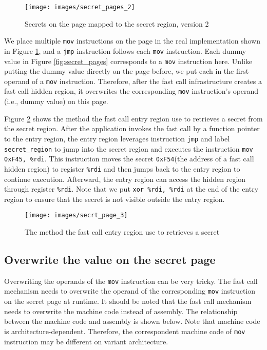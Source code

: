  \begin{figure}[tbp]
   \centering
   \texttt{[image: images/secret\_pages\_2]}
   \caption[Short description]{Secrets on the page mapped to the secret region, version 2}
    \label{fig:secret_pages_2}
 \end{figure}
  
 We place multiple \verb|mov| instructions on the page in the real implementation shown in Figure \ref{fig:secret_pages_2},
 and a \verb|jmp| instruction follows each \verb|mov| instruction. Each dummy value in 
 Figure \ref{fig:secret_pages} corresponds to a \verb|mov| instruction here. Unlike putting the 
 dummy value directly on the page before, we put each in the first operand of
  a \verb|mov| instruction. Therefore, after the fast call infrastructure creates a fast 
  call hidden region, it overwrites the corresponding \verb|mov| instruction's 
  operand (i.e., dummy value) on this page.  

  Figure \ref{fig:secrt_page_3}  shows the method the fast call entry region use to retrieves a 
  secret from the secret region. After the application invokes the 
  fast call by a function pointer to the entry region, the entry region 
  leverages instruction \verb|jmp| and label \verb|secret_region| to jump into the 
  secret region and executes the instruction \verb|mov 0xF45, %rdi|. This 
  instruction moves the secret \verb|0xF54|(the address of a fast call hidden region) 
  to register \verb|%rdi| and then jumps back to the entry region to continue execution. 
  Afterward, the entry region can access the hidden region through register \verb|%rdi|.
  Note that we put  \verb|xor %rdi, %rdi| at the end of the entry region to ensure that the secret is not visible outside the entry region. 

  \begin{figure}[H]
    \centering
    \texttt{[image: images/secrt\_page\_3]}
    \caption[Short description]{The method the fast call entry region use to retrieves a 
    secret}
     \label{fig:secrt_page_3}
  \end{figure}

  \subsection{Overwrite the value on the secret page}

  Overwriting the operands of the \verb|mov| instruction can be very tricky. 
  The fast call mechanism needs to overwrite the operand of the corresponding 
  \verb|mov| instruction on the secret page at runtime. It should be noted that 
  the fast call mechanism needs to overwrite the machine code instead of 
  assembly. The relationship between the machine code and assembly is 
  shown below. Note that machine code is architecture-dependent. Therefore, the correspondent 
  machine code of \verb|mov| instruction may be different on variant architecture.
   

